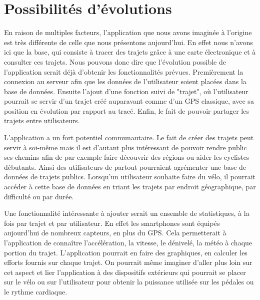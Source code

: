 \newpage
\section{Possibilités d'évolutions}
En raison de multiples facteurs, l'application que nous avons imaginée à l'origine est très différente de celle que nous présentons aujourd'hui.
En effet nous n'avons ici que la base, qui consiste à tracer des trajets grâce à une carte électronique et à consulter ces trajets. Nous pouvons
donc dire que l'évolution possible de l'application serait déjà d'obtenir les fonctionnalités prévues. Premièrement la connexion au serveur
afin que les données de l'utilisateur soient placées dans la base de données. Ensuite l'ajout d'une fonction suivi de "trajet", où l'utilisateur
pourrait se servir d'un trajet créé auparavant comme d'un GPS classique, avec sa position en évolution par rapport au tracé. Enfin, le fait
de pouvoir partager les trajets entre utilisateurs.

L'application a un fort potentiel communautaire. Le fait de créer des trajets peut servir à soi-même mais il est d'autant plus intéressant
de pouvoir rendre public ses chemins afin de par exemple faire découvrir des régions ou aider les cyclistes débutants. Ainsi des utilisateurs
de partout pourraient agrémenter une base de données de trajets publics. Lorsqu'un utilisateur souhaite faire du vélo, il pourrait accéder
à cette base de données en triant les trajets par endroit géographique, par difficulté ou par durée.

Une fonctionnalité intéressante à ajouter serait un ensemble de statistiques, à la fois par trajet et par utilisateur. En effet les smartphones
sont équipés aujourd'hui de nombreux capteurs, en plus du GPS. Cela permetterait à l'application de connaître l'accélération, la vitesse, le
dénivelé, la météo à chaque portion du trajet. L'application pourrait en faire des graphiques, en calculer les efforts fournis sur chaque trajet.
On pourrait même imaginer d'aller plus loin sur cet aspect et lier l'application à des dispositifs extérieurs qui pourrait se placer sur le
vélo ou sur l'utilisateur pour obtenir la puissance utilisée sur les pédales ou le rythme cardiaque.